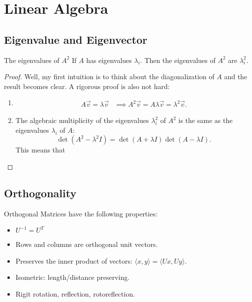 \documentclass[../main]{subfiles}
\begin{document}
\chapter{Linear Algebra}
\section{Eigenvalue and Eigenvector}
\begin{bbox}{The eigenvalues of $A^2$}
    If $A$ has eigenvalues $\lambda_i$. Then the eigenvalues of $A^2$ are $\lambda_i^2$.
    \begin{proof}
        Well, my first intuition is to think about the diagonalization of $A$ and the result becomes clear.
        \newline
        A rigorous proof is also not hard: 
        \begin{enumerate}
            \item \begin{align*}
                A\vec v = \lambda \vec v &\implies A^2 \vec v = A \lambda\vec v = \lambda^2 \vec v.
            \end{align*}
        \item 
            The algebraic multiplicity of the eigenvalues $\lambda^2_i$ of $A^2$ is the same as the eigenvalues $\lambda_i$ of $A$:
            \[
            \det (A^2 - \lambda^2 I) = \det (A+\lambda I)\det (A-\lambda I).
            \]
            This means that
        \end{enumerate}
    \end{proof}
\end{bbox}

\section{Orthogonality}
Orthogonal Matrices have the following properties:
\begin{itemize}
    \item $U^{-1}=U^T$
    \item Rows and columns are orthogonal unit vectors.
    \item Preserves the inner product of vectors: $\langle x,y\rangle = \langle Ux, Uy\rangle$.
    \item Isometric: length/distance preserving.
    \item Rigit rotation, reflection, rotoreflection.
\end{itemize}
\end{document}
